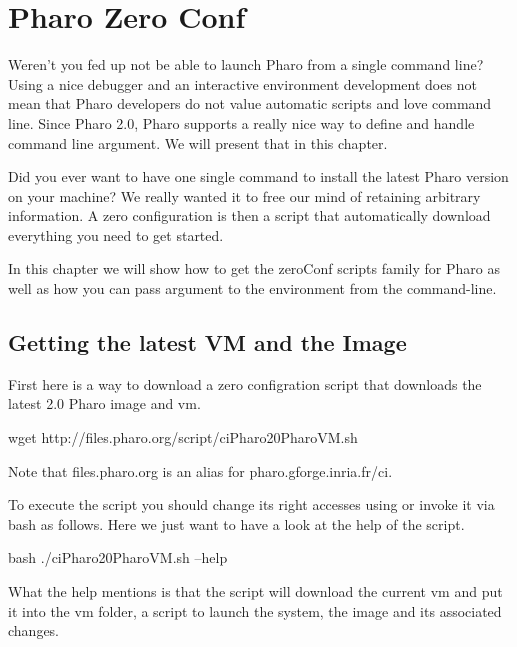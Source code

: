 \documentclass[a4paper,10pt,twoside]{book}
\begin{document}
\fi
\sloppy

\chapter{Pharo Zero Conf}


Weren't you fed up not be able to launch Pharo from a single command line? 
Using a nice debugger and an interactive environment development does not 
mean that Pharo developers do not value automatic scripts and love command line.
Since Pharo 2.0, Pharo supports a really nice way to define and handle command line argument. 
We will present that in this chapter. 

Did you ever want to have one single command to install the latest Pharo version on your machine?
We really wanted it to free our mind of retaining arbitrary information. 
A zero configuration is then a script that automatically download everything you need to get started. 

In this chapter we will show how to get the zeroConf scripts family for Pharo as well as how you can 
pass argument to the environment from the command-line.



\section{Getting the latest VM and the Image}
First here is a way to download a zero configration script that downloads the latest 2.0 Pharo image and vm. 

\begin{code}{}
wget http://files.pharo.org/script/ciPharo20PharoVM.sh
\end{code}

Note that files.pharo.org is an alias for pharo.gforge.inria.fr/ci.

To execute the script you should change its right accesses using   or invoke it via bash as follows. Here we just want to have a look at the help of the script.

\begin{code}{}
bash ./ciPharo20PharoVM.sh --help 
\end{code}

What the help mentions is that the script will download the current vm and put it into the vm folder, a script to launch the system, the image and its associated changes. 
\end{document}
